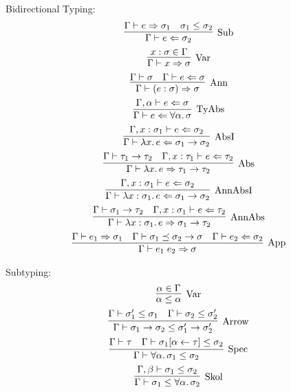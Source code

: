 Bidirectional Typing:
\begin{gather*}
  \infer[\text{Sub}]{
    \Gamma \vdash e \Leftarrow \sigma_2
  }{
    \Gamma \vdash e \Rightarrow \sigma_1
    &
    \sigma_1 \leq \sigma_2
  }
  \\
  \infer[\text{Var}]{
    \Gamma \vdash x \Rightarrow \sigma
  }{
    x: \sigma \in \Gamma
  }
  \\
  \infer[\text{Ann}]{
    \Gamma \vdash (e: \sigma) \Rightarrow \sigma
  }{
    \Gamma \vdash \sigma
    &
    \Gamma \vdash e \Leftarrow \sigma
  }
  \\
  \infer[\text{TyAbs}]{
    \Gamma \vdash e \Leftarrow \forall \alpha\ldotp \sigma
  }{
    \Gamma, \alpha \vdash e \Leftarrow \sigma
  }
  \\
  \infer[\text{AbsI}]{
    \Gamma \vdash \lambda x\ldotp e \Leftarrow \sigma_1 \to \sigma_2
  }{
    \Gamma, x: \sigma_1 \vdash e \Leftarrow \sigma_2
  }
  \\
  \infer[\text{Abs}]{
    \Gamma \vdash \lambda x\ldotp e \Rightarrow \tau_1 \to \tau_2
  }{
    \Gamma \vdash \tau_1 \to \tau_2
    &
    \Gamma, x: \tau_1 \vdash e \Leftarrow \tau_2
  }
  \\
  \infer[\text{AnnAbsI}]{
    \Gamma \vdash \lambda x: \sigma_1\ldotp e \Leftarrow \sigma_1 \to \sigma_2
  }{
    \Gamma, x: \sigma_1 \vdash e \Leftarrow \sigma_2
  }
  \\
  \infer[\text{AnnAbs}]{
    \Gamma \vdash \lambda x: \sigma_1\ldotp e \Rightarrow \sigma_1 \to \tau_2
  }{
    \Gamma \vdash \sigma_1 \to \tau_2
    &
    \Gamma, x: \sigma_1 \vdash e \Leftarrow \tau_2
  }
  \\
  \infer[\text{App}]{
    \Gamma \vdash e_1\; e_2 \Rightarrow \sigma
  }{
    \Gamma \vdash e_1 \Rightarrow \sigma_1
    &
    \Gamma \vdash \sigma_1 \preceq \sigma_2 \to \sigma
    &
    \Gamma \vdash e_2 \Leftarrow \sigma_2
  }
\end{gather*}

Subtyping:
\begin{gather*}
  \infer[\text{Var}]{
    \alpha \leq \alpha
  }{
    \alpha \in \Gamma
  }
  \\
  \infer[\text{Arrow}]{
    \Gamma \vdash \sigma_1 \to \sigma_2 \leq \sigma'_1 \to \sigma'_2
  }{
    \Gamma \vdash \sigma'_1 \leq \sigma_1
    &
    \Gamma \vdash \sigma_2 \leq \sigma'_2
  }
  \\
  \infer[\text{Spec}]{
    \Gamma \vdash \forall \alpha\ldotp \sigma_1 \leq \sigma_2
  }{
    \Gamma \vdash \tau
    &
    \Gamma \vdash \sigma_1[\alpha \assign \tau] \leq \sigma_2
  }
  \\
  \infer[\text{Skol}]{
    \Gamma \vdash \sigma_1 \leq \forall \alpha\ldotp \sigma_2
  }{
    \Gamma, \beta \vdash \sigma_1 \leq \sigma_2
  }
\end{gather*}

